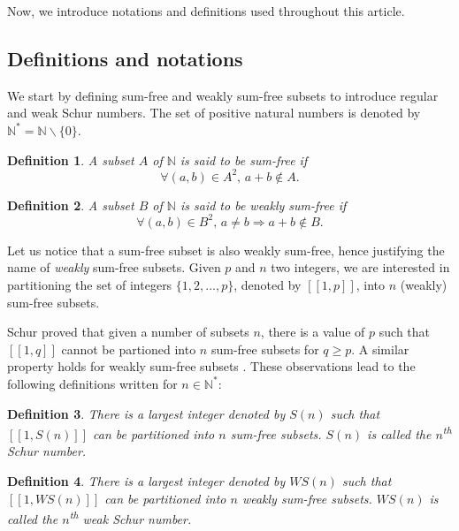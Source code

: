 \documentclass{article}
\newtheorem{definition}{Definition}[section]
\newtheorem{computational theorem}[definition]{Computational Theorem}
\newcommand{\WS}{\mathit{WS}}
\begin{document}
\par
Now, we introduce notations and definitions used throughout this article.

\subsection{Definitions and notations}

We start by defining sum-free and weakly sum-free subsets to introduce regular and weak Schur numbers.
The set of positive natural numbers is denoted by \(\mathbb{N}^* =\mathbb{N} \backslash \{0\}\).

\begin{definition}
A subset \(A\) of \(\mathbb{N}\) is said to be \textit{sum-free} if
\[ \forall (a,b) \in A^2 \text{, } a+b \notin A.\]
\end{definition}

\begin{definition}
A subset \(B\) of \(\mathbb{N}\) is said to be \textit{weakly sum-free} if
\[ \forall (a,b) \in B^2 \text{, } a \neq b \Longrightarrow a+b \notin B.\]
\end{definition}

Let us notice that a sum-free subset is also weakly sum-free, hence justifying the name of \textit{weakly} sum-free
subsets. Given \(p\) and \(n\) two integers, we are interested in partitioning the set of integers \(\{1, 2, ..., p\}\),
denoted by \([\![1,p]\!]\), into \(n\) (weakly) sum-free subsets.

\par
Schur proved \cite{Schur1917} that given a number of subsets \(n\), there is a value of \(p\)
such that \([\![1,q]\!]\) cannot be partioned into \(n\) sum-free subsets for \(q \geqslant p\). A similar
property holds for weakly sum-free subsets \cite{Irving1973}. These observations lead to the following definitions
written for \(n \in \mathbb{N}^*\):

\begin{definition}
There is a largest integer denoted by \(S(n)\) such that \([\![1, S(n)]\!]\) can be
 partitioned into \(n\) sum-free subsets. \(S(n)\) is called the \textit{\(n\)\textsuperscript{th} Schur number}.
\end{definition}

\begin{definition}
There is a largest integer denoted by \(\WS (n)\) such that \([\![1, \WS (n)]\!]\)
can be partitioned into \(n\) weakly sum-free subsets. \(\WS(n)\) is called the \(n\)\textsuperscript{th} weak Schur
number.
\end{definition}
\end{document}

